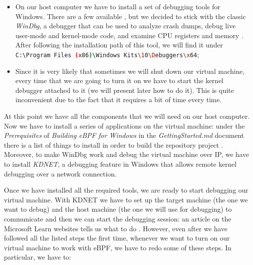 \begin{itemize}
	\item 
		On our host computer we have to install a set of debugging tools for Windows.
		There are a few available \cite{DbgToolsWin}, but we decided to stick with the classic \textit{WinDbg}, a debugger that can be used to analyze crash dumps, debug live user-mode and kernel-mode code, and examine CPU registers and memory \cite{InstallWinDbg}.
		After following the installation path of this tool, we will find it under \lstinline[style=commandline, language=bash]|C:\Program Files (x86)\Windows Kits\10\Debuggers\x64|;
	\item 
		Since it is very likely that sometimes we will shut down our virtual machine, every time that we are going to turn it on we have to start the kernel debugger attached to it (we will present later how to do it).
		This is quite inconvenient due to the fact that it requires a bit of time every time.  
\end{itemize}

At this point we have all the components that we will need on our host computer.
Now we have to install a series of applications on the virtual machine: under the \textit{Prerequisites} of \textit{Building eBPF for Windows} in the \textit{GettingStarted.md} document there is a list of things to install in order to build the repository project \cite{GetStartDoc}.
Moreover, to make WinDbg work and debug the virtual machine over IP, we have to install \textit{KDNET}, a debugging feature in Windows that allows remote kernel debugging over a network connection.

Once we have installed all the required tools, we are ready to start debugging our virtual machine.
With KDNET we have to set up the target machine (the one we want to debug) and the host machine (the one we will use for debugging) to communicate and then we can start the debugging session: an article on the Microsoft Learn websites tells us what to do \cite{SetUpNetDebug}.
However, even after we have followed all the listed steps the first time, whenever we want to turn on our virtual machine to work with eBPF, we have to redo some of these steps.
In particular, we have to:

